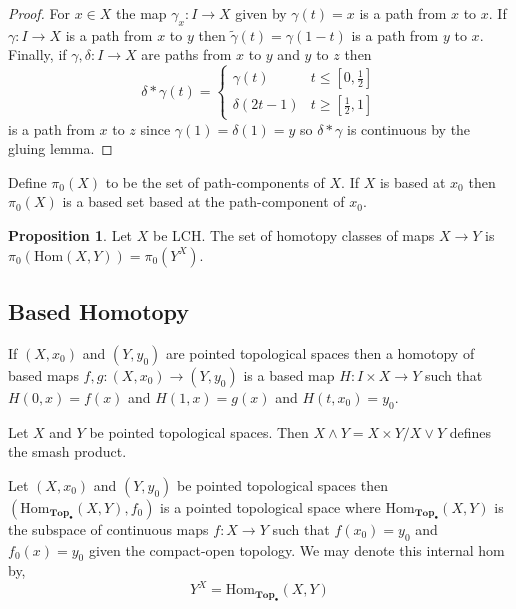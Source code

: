 \documentclass[12pt]{extarticle}
\newcommand{\Hom}[2]{\mathrm{Hom}\left( #1, #2 \right)}
\newcommand{\catHom}[3]{\mathrm{Hom}_{#1}\left( #2, #3 \right)}
\newcommand{\pTop}{\mathbf{Top}_{\bullet}}
\theoremstyle{definition}
\newtheorem{proposition}[theorem]{Proposition}
\newenvironment{definition}[1][Definition:]{\begin{trivlist}
\item[\hskip \labelsep {\bfseries #1}]}{\end{trivlist}}
\begin{document}
\begin{proof}
For $x \in X$ the map $\gamma_x : I \to X$ given by $\gamma(t) = x$ is a path from $x$ to $x$. If $\gamma : I \to X$ is a path from $x$ to $y$ then $\tilde{\gamma}(t) = \gamma(1-t)$ is a path from $y$ to $x$. Finally, if $\gamma, \delta : I \to X$ are paths from $x$ to $y$ and $y$ to $z$ then
\[ \delta * \gamma(t) = 
\begin{cases}
\gamma(t) & t \le [0, \tfrac{1}{2} ]
\\
\delta(2t - 1) & t \ge [\tfrac{1}{2}, 1] 
\end{cases}
\]
is a path from $x$ to $z$ since $\gamma(1) = \delta(1) = y$ so $\delta * \gamma$ is continuous by the gluing lemma. 
\end{proof}

\begin{definition}
Define $\pi_0(X)$ to be the set of path-components of $X$. If $X$ is based at $x_0$ then $\pi_0(X)$ is a based set based at the path-component of $x_0$.
\end{definition}

\begin{proposition}
Let $X$ be LCH. The set of homotopy classes of maps $X \to Y$ is $\pi_0(\Hom{X}{Y}) = \pi_0(Y^X)$. 
\end{proposition}


\subsection{Based Homotopy}

\begin{definition}
If $(X, x_0)$ and $(Y, y_0)$ are pointed topological spaces then a homotopy of based maps $f, g : (X, x_0) \to (Y, y_0)$ is a based map $H : I \times X \to Y$ such that $H(0, x) = f(x)$ and $H(1, x) = g(x)$ and $H(t, x_0) = y_0$.
\end{definition}

\begin{definition}
Let $X$ and $Y$ be pointed topological spaces. Then $X \wedge Y =  X \times Y / X \vee Y$ defines the smash product.
\end{definition}

\begin{definition}
Let $(X, x_0)$ and $(Y, y_0)$ be pointed topological spaces then $(\catHom{\pTop}{X}{Y}, f_0)$ is a pointed topological space where $\catHom{\pTop} {X}{Y}$ is the subspace of continuous maps $f : X \to Y$ such that $f(x_0) = y_0$ and $f_0(x) = y_0$ given the compact-open topology. We may denote this internal hom by, 
\[ Y^X = \catHom{\pTop}{X}{Y}\]  
\end{definition}
\end{document}
